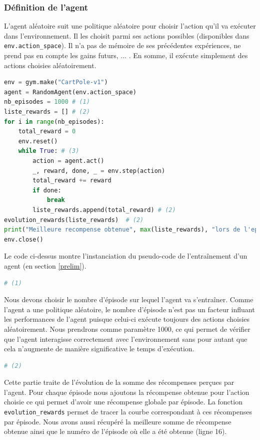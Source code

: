\documentclass[10pt,a4paper]{article}
\begin{document}
\subsubsection{Définition de l'agent} \label{defAgentRand}
L'agent aléatoire suit une politique aléatoire pour choisir l'action qu'il va exécuter dans l'environnement. Il les choisit parmi ses actions possibles (disponibles dans \lstinline{env.action_space}). Il n'a pas de mémoire de ses précédentes expériences, ne prend pas en compte les gains futurs, ... . En somme, il exécute simplement des actions choisies aléatoirement.

\begin{lstlisting}[language=Python, caption=Programme principal de l'agent aléatoire]
env = gym.make("CartPole-v1")
agent = RandomAgent(env.action_space)
nb_episodes = 1000 # (1)
liste_rewards = [] # (2)
for i in range(nb_episodes): 
    total_reward = 0
    env.reset()
    while True: # (3)
        action = agent.act()
        _, reward, done, _ = env.step(action)
        total_reward += reward
        if done:
            break
        liste_rewards.append(total_reward) # (2)
evolution_rewards(liste_rewards)  # (2)
print("Meilleure recompense obtenue", max(liste_rewards), "lors de l'episode", liste_rewards.index(max(liste_rewards))) # (2)
env.close()

\end{lstlisting}

Le code ci-dessus montre l'instanciation du pseudo-code de l'entraînement d'un agent (en section \ref{prelim}).

\begin{lstlisting}[language=Python]
# (1)
\end{lstlisting}
Nous devons choisir le nombre d'épisode sur lequel l'agent va s'entraîner. Comme l'agent a une politique aléatoire, le nombre d'épisode n'est pas un facteur influant les performances de l'agent puisque celui-ci exécute toujours des actions choisies aléatoirement. Nous prendrons comme paramètre 1000, ce qui permet de vérifier que l'agent interagisse correctement avec l'environnement sans pour autant que cela n'augmente de manière significative le temps d'exécution.

\begin{lstlisting}[language=Python]
# (2)
\end{lstlisting}
Cette partie traite de l'évolution de la somme des récompenses perçues par l'agent. Pour chaque épisode nous ajoutons la récompense obtenue pour l'action choisie ce qui permet d'avoir une récompense \og globale \fg{}  par épisode. La fonction \lstinline{evolution_rewards} permet de tracer la courbe correspondant à ces récompenses par épisode. Nous avons aussi récupéré la meilleure somme de récompense obtenue ainsi que le numéro de l'épisode où elle a été obtenue (ligne 16).
\end{document}
